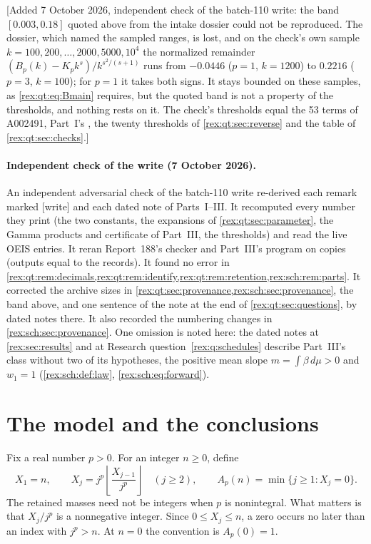 [Added 7 October 2026, independent check of the batch-110 write: the band
$[0.003,0.18]$ quoted above from the intake dossier could not be
reproduced. The dossier, which named the sampled ranges, is lost, and on
the check's own sample $k=100,200,\dots,2000,5000,10^4$ the normalized
remainder $(B_p(k)-K_pk^s)/k^{s^2/(s+1)}$ runs from $-0.0446$ ($p=1$,
$k=1200$) to $0.2216$ ($p=3$, $k=100$); for $p=1$ it takes both signs. It
stays bounded on these samples, as \eqref{rex:qt:eq:Bmain} requires, but
the quoted band is not a property of the thresholds, and nothing rests
on it. The check's thresholds equal the 53 terms of A002491, Part~I's
, the twenty thresholds of
\cref{rex:qt:sec:reverse} and the table of \cref{rex:qt:sec:checks}.]

\paragraph{Independent check of the write (7 October 2026).} An
independent adversarial check of the batch-110 write re-derived each
remark marked \textsf{[write]} and each dated note of Parts~I--III. It
recomputed every number they print (the two constants, the expansions of
\cref{rex:qt:sec:parameter}, the Gamma products and certificate of
Part~III, the thresholds) and read the live OEIS entries. It reran
Report~188's checker and Part~III's program on copies (outputs equal to
the records). It found no error in \cref{rex:qt:rem:decimals,rex:qt:rem:identify,rex:qt:rem:retention,rex:sch:rem:parts}.
It corrected the archive sizes in
\cref{rex:qt:sec:provenance,rex:sch:sec:provenance}, the band above, and
one sentence of the note at the end of \cref{rex:qt:sec:questions}, by
dated notes there. It also recorded the numbering changes in
\cref{rex:sch:sec:provenance}. One omission is noted here: the dated notes
at \cref{rex:sec:results} and at Research question~\ref{rex:q:schedules}
describe Part~III's class without two of its hypotheses, the positive
mean slope $m=\int\beta\,d\mu>0$ and $w_1=1$ (\cref{rex:sch:def:law},
\eqref{rex:sch:eq:forward}).

\section{The model and the conclusions}\label{rex:qt:sec:main}
Fix a real number $p>0$. For an integer $n\ge0$, define
\begin{equation}\label{rex:qt:eq:model}
 X_1=n,\qquad
 X_j=j^p\left\lfloor\frac{X_{j-1}}{j^p}\right\rfloor\quad(j\ge2),
 \qquad A_p(n)=\min\{j\ge1:X_j=0\}.
\end{equation}
The retained masses need not be integers when $p$ is nonintegral. What matters is that $X_j/j^p$ is a nonnegative integer. Since $0\le X_j\le n$, a zero occurs no later than an index with $j^p>n$. At $n=0$ the convention is $A_p(0)=1$.

